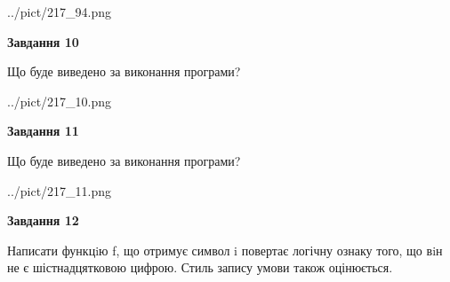 \documentclass[12pt, ukrainian]{article}
\begin{document}
{\begin {large}
\begin{center}
	{../pict/217_94.png}
\end{center}
\newpage

{\begin {center}\textbf{Завдання 10}\end {center}}

Що буде виведено за виконання програми?\par
\begin{center}
	{../pict/217_10.png}
\end{center}
\newpage

{\begin {center}\textbf{Завдання 11}\end {center}}

Що буде виведено за виконання програми?\par
\begin{center}
	{../pict/217_11.png}
\end{center}
\newpage

{\begin {center}\textbf{Завдання 12}\end {center}}


Написати функцiю f, що отримує символ i повертає логічну ознаку того, що вiн не є шістнадцятковою цифрою. Стиль запису умови також оцінюється.\par
\newpage

\end {large}}
\end{document}
